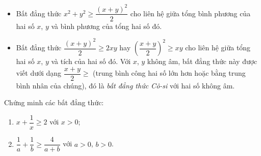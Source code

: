 \begin{nx} \quad
	\begin{itemize}
		\item Bất đẳng thức $x^2+y^2\ge  \dfrac{\left(x+y\right)^2}{2}$ cho liên hệ giữa tổng bình phương của hai số $x$, $y$ và bình phương của tổng hai số đó.
		\item Bất đẳng thức $\dfrac{\left(x+y\right)^2}{2}\ge 2xy$ hay $\left(\dfrac{x+y}{2}\right)^2\ge xy$ cho liên hệ  giữa tổng hai số $x$, $y$ và tích của hai số đó. Với $x$, $y$ không âm, bất đẳng thức này được viết dưới dạng $\dfrac{x+y}{2}\ge $ (trung bình công hai số lớn hơn hoặc bằng trung bình nhân của chúng), đó là \textit{bất đẳng thức Cô-si} với hai số không âm.
	\end{itemize}
\end{nx}
\begin{vd}%
Chứng minh các bất đẳng thức:
\begin{enumerate}
\item $x+\dfrac{1}{x}\ge 2$ với $x>0$;
\item $\dfrac{1}{a}+\dfrac{1}{b}\ge \dfrac{4}{a+b}$ với $a>0$, $b>0$.
\end{enumerate}
\end{vd}

